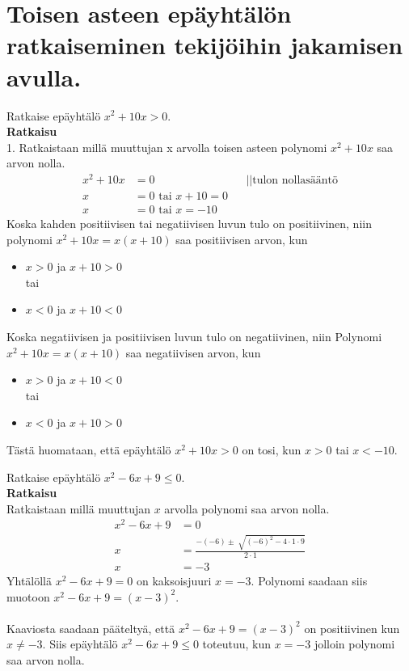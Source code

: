 \section{Toisen asteen epäyhtälön ratkaiseminen tekijöihin jakamisen avulla.}
\begin{esimerkki} 
Ratkaise epäyhtälö $x^2+10x>0$. \\
\textbf{Ratkaisu} \\
1. Ratkaistaan millä muuttujan x arvolla toisen asteen polynomi $x^2+10x$ saa arvon nolla. 
\begin{align*}
x^2+10x&=0 \ \ \ \ &&||\text{tulon nollasääntö} \\
x&=0 \text{ tai } x+10=0 \\
x&=0 \text{ tai } x=-10
\end{align*}
Koska kahden positiivisen tai negatiivisen luvun tulo on positiivinen, niin
polynomi $x^2+10x=x(x+10)$ saa positiivisen arvon, kun 
\begin{itemize}
\item{$x>0$ ja $x+10>0$} \\tai \\
\item{$x<0$ ja $x+10<0$} 
\end{itemize}
Koska negatiivisen ja positiivisen luvun tulo on negatiivinen, niin
Polynomi $x^2+10x=x(x+10)$ saa negatiivisen arvon, kun
\begin{itemize}
\item{$x>0$ ja $x+10<0$} \\ tai \\
\item{$x<0$ ja $x+10>0$} \\
\end{itemize}
Tästä huomataan, että epäyhtälö $x^2+10x>0$ on tosi, kun $x>0$ tai $x<-10$. 
\end{esimerkki} 
\begin{esimerkki}
Ratkaise epäyhtälö $x^2-6x+9 \leq 0$. \\
\textbf{Ratkaisu} \\
Ratkaistaan millä muuttujan $x$ arvolla polynomi saa arvon nolla.
\begin{align*}
x^2-6x+9&=0 \\
x&=\frac{-(-6) \pm \sqrt[]{(-6)^2-4 \cdot 1 \cdot 9}}{2 \cdot 1} \\
x&=-3
\end{align*}
Yhtälöllä $x^2-6x+9=0$ on kaksoisjuuri $x=-3$. 
Polynomi saadaan siis muotoon $x^2-6x+9=(x-3)^2$. \\
 \\
Kaaviosta saadaan pääteltyä, että $x^2-6x+9=(x-3)^2$ on positiivinen kun $x \neq -3$. Siis epäyhtälö $x^2-6x+9 \leq 0$ toteutuu, kun $x=-3$ jolloin polynomi saa arvon nolla. 
\end{esimerkki}
